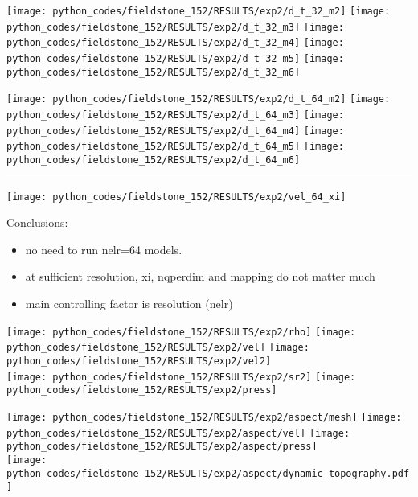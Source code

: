 \noindent
\texttt{[image: python\_codes/fieldstone\_152/RESULTS/exp2/d\_t\_32\_m2]}
\texttt{[image: python\_codes/fieldstone\_152/RESULTS/exp2/d\_t\_32\_m3]}
\texttt{[image: python\_codes/fieldstone\_152/RESULTS/exp2/d\_t\_32\_m4]}
\texttt{[image: python\_codes/fieldstone\_152/RESULTS/exp2/d\_t\_32\_m5]}
\texttt{[image: python\_codes/fieldstone\_152/RESULTS/exp2/d\_t\_32\_m6]}

\noindent
\texttt{[image: python\_codes/fieldstone\_152/RESULTS/exp2/d\_t\_64\_m2]}
\texttt{[image: python\_codes/fieldstone\_152/RESULTS/exp2/d\_t\_64\_m3]}
\texttt{[image: python\_codes/fieldstone\_152/RESULTS/exp2/d\_t\_64\_m4]}
\texttt{[image: python\_codes/fieldstone\_152/RESULTS/exp2/d\_t\_64\_m5]}
\texttt{[image: python\_codes/fieldstone\_152/RESULTS/exp2/d\_t\_64\_m6]}

\hrule

\texttt{[image: python\_codes/fieldstone\_152/RESULTS/exp2/vel\_64\_xi]}


Conclusions:
\begin{itemize}
\item no need to run nelr=64 models.
\item at sufficient resolution, xi, nqperdim and mapping do not matter 
much 
\item main controlling factor is resolution (nelr)
\end{itemize}


\begin{center}
\texttt{[image: python\_codes/fieldstone\_152/RESULTS/exp2/rho]}
\texttt{[image: python\_codes/fieldstone\_152/RESULTS/exp2/vel]}
\texttt{[image: python\_codes/fieldstone\_152/RESULTS/exp2/vel2]}\\
\texttt{[image: python\_codes/fieldstone\_152/RESULTS/exp2/sr2]}
\texttt{[image: python\_codes/fieldstone\_152/RESULTS/exp2/press]}
\end{center}



\begin{center}
\texttt{[image: python\_codes/fieldstone\_152/RESULTS/exp2/aspect/mesh]}
\texttt{[image: python\_codes/fieldstone\_152/RESULTS/exp2/aspect/vel]}
\texttt{[image: python\_codes/fieldstone\_152/RESULTS/exp2/aspect/press]}\\
\texttt{[image: python\_codes/fieldstone\_152/RESULTS/exp2/aspect/dynamic\_topography.pdf]}\\
\end{center}



